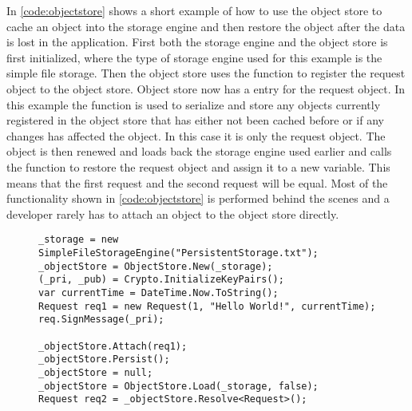 In \autoref{code:objectstore} shows a short example of how to use the object store to cache an object into the storage engine and then restore the object after the data is lost in the application. First both the storage engine and the object store is first initialized, where the type of storage engine used for this example is the simple file storage. Then the object store uses the  function to register the request object to the object store. Object store now has a  entry for the request object. In this example the  function is used to serialize and store any objects currently registered in the object store that has either not been cached before or if any changes has affected the object. In this case it is only the request object. The object is then renewed and loads back the storage engine used earlier and calls the  function to restore the request object and assign it to a new variable. This means that the first request and the second request will be equal. Most of the functionality shown in \autoref{code:objectstore} is performed behind the scenes and a developer rarely has to attach an object to the object store directly.  

\begin{figure}[H]
	\centering
	\begin{lstlisting}[label = code:objectstore, caption=Object Store example, captionpos=b, basicstyle=\scriptsize]
_storage = new SimpleFileStorageEngine("PersistentStorage.txt");
_objectStore = ObjectStore.New(_storage);
(_pri, _pub) = Crypto.InitializeKeyPairs();	
var currentTime = DateTime.Now.ToString();
Request req1 = new Request(1, "Hello World!", currentTime);
req.SignMessage(_pri);
           
_objectStore.Attach(req1);
_objectStore.Persist();
_objectStore = null;
_objectStore = ObjectStore.Load(_storage, false);
Request req2 = _objectStore.Resolve<Request>();
	\end{lstlisting}
\end{figure}

